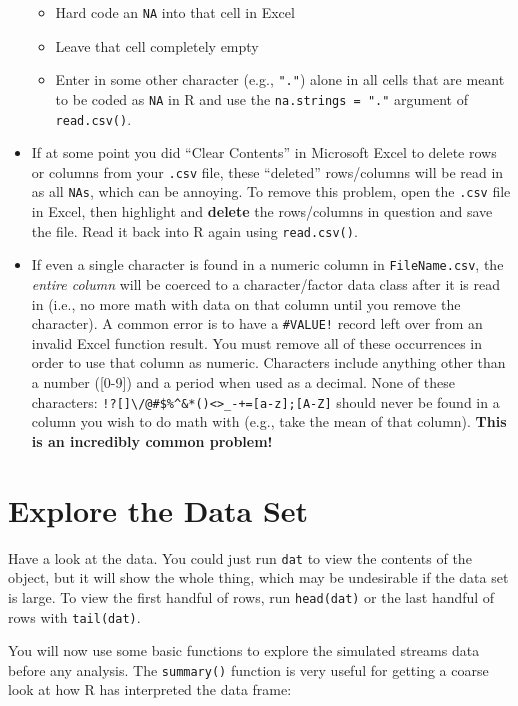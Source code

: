\documentclass[]{book}
\providecommand{\tightlist}{%
  \setlength{\itemsep}{0pt}\setlength{\parskip}{0pt}}
\theoremstyle{definition}
\theoremstyle{definition}
\theoremstyle{definition}
\theoremstyle{remark}
\begin{document}
\begin{itemize}
  \begin{itemize}
  \tightlist
  \item
    Hard code an \texttt{NA} into that cell in Excel
  \item
    Leave that cell completely empty
  \item
    Enter in some other character (e.g., \texttt{"."}) alone in all
    cells that are meant to be coded as \texttt{NA} in R and use the
    \texttt{na.strings\ =\ "."} argument of \texttt{read.csv()}.
  \end{itemize}
\item
  If at some point you did ``Clear Contents'' in Microsoft Excel to
  delete rows or columns from your \texttt{.csv} file, these ``deleted''
  rows/columns will be read in as all \texttt{NAs}, which can be
  annoying. To remove this problem, open the \texttt{.csv} file in
  Excel, then highlight and \textbf{delete} the rows/columns in question
  and save the file. Read it back into R again using
  \texttt{read.csv()}.
\item
  If even a single character is found in a numeric column in
  \texttt{FileName.csv}, the \emph{entire column} will be coerced to a
  character/factor data class after it is read in (i.e., no more math
  with data on that column until you remove the character). A common
  error is to have a \texttt{\#VALUE!} record left over from an invalid
  Excel function result. You must remove all of these occurrences in
  order to use that column as numeric. Characters include anything other
  than a number ({[}0-9{]}) and a period when used as a decimal. None of
  these characters:
  \texttt{!?{[}{]}\textbackslash{}/@\#\$\%\^{}\&*()\textless{}\textgreater{}\_-+={[}a-z{]};{[}A-Z{]}}
  should never be found in a column you wish to do math with (e.g., take
  the mean of that column). \textbf{This is an incredibly common
  problem!}
\end{itemize}

\section{Explore the Data Set}\label{data-summaries}

Have a look at the data. You could just run \texttt{dat} to view the
contents of the object, but it will show the whole thing, which may be
undesirable if the data set is large. To view the first handful of rows,
run \texttt{head(dat)} or the last handful of rows with
\texttt{tail(dat)}.

You will now use some basic functions to explore the simulated streams
data before any analysis. The \texttt{summary()} function is very useful
for getting a coarse look at how R has interpreted the data frame:
\end{document}
